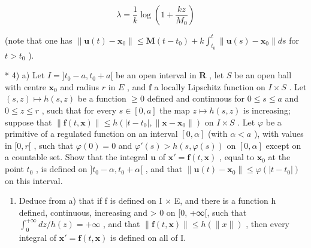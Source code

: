 \[
\lambda = \frac {1}{k} \log \left(1 + \frac {k z}{M _ {0}}\right)
\]

(note that one has \(\| \mathbf{u}(t) - \mathbf{x}_0\| \leqslant \mathbf{M}(t - t_0) + k\int_{t_0}^t\| \mathbf{u}(s) - \mathbf{x}_0\| ds\) for \(t > t_0\) ).

* 4) a) Let \(I = ]t_0 - a, t_0 + a[\) be an open interval in \(\mathbf{R}\) , let \(S\) be an open ball with centre \(\mathbf{x}_0\) and radius \(r\) in \(E\) , and \(\mathbf{f}\) a locally Lipschitz function on \(I \times S\) . Let \((s, z) \mapsto h(s, z)\) be a function \(\geqslant 0\) defined and continuous for \(0 \leqslant s \leqslant a\) and \(0 \leqslant z \leqslant r\) , such that for every \(s \in [0, a]\) the map \(z \mapsto h(s, z)\) is increasing; suppose that \(\| \mathbf{f}(t, \mathbf{x}) \| \leqslant h(|t - t_0|, \| \mathbf{x} - \mathbf{x}_0 \|)\) on \(I \times S\) . Let \(\varphi\) be a primitive of a regulated function on an interval \([0, \alpha]\) (with \(\alpha < a\) ), with values in \([0, r[\) , such that \(\varphi(0) = 0\) and \(\varphi'(s) > h(s, \varphi(s))\) on \([0, \alpha]\) except on a countable set. Show that the integral \(\mathbf{u}\) of \(\mathbf{x}' = \mathbf{f}(t, \mathbf{x})\) , equal to \(\mathbf{x}_0\) at the point \(t_0\) , is defined on \(]t_0 - \alpha, t_0 + \alpha[\) , and that \(\| \mathbf{u}(t) - \mathbf{x}_0 \| \leqslant \varphi(|t - t_0|)\) on this interval.

\begin{enumerate}
\def\labelenumi{\alph{enumi})}
\setcounter{enumi}{1}
\tightlist
\item
  Deduce from a) that if f is defined on I × E, and there is a function h defined, continuous, increasing and \textgreater{} 0 on {[}0, +∞{[}, such that \(\int_{0}^{+\infty} dz / h(z) = +\infty\) , and that \(\|\mathbf{f}(t, \mathbf{x})\| \leqslant h(\|x\|)\) , then every integral of \(\mathbf{x}' = \mathbf{f}(t, \mathbf{x})\) is defined on all of I.
\end{enumerate}

